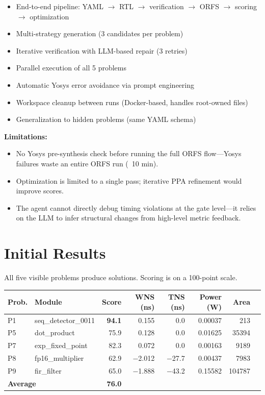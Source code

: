 \documentclass[10pt]{article}
\begin{document}
\begin{itemize}[topsep=2pt,itemsep=0pt]
  \item End-to-end pipeline: YAML $\to$ RTL $\to$ verification $\to$ ORFS $\to$ scoring $\to$ optimization
  \item Multi-strategy generation (3 candidates per problem)
  \item Iterative verification with LLM-based repair (3 retries)
  \item Parallel execution of all 5 problems
  \item Automatic Yosys error avoidance via prompt engineering
  \item Workspace cleanup between runs (Docker-based, handles root-owned files)
  \item Generalization to hidden problems (same YAML schema)
\end{itemize}

\textbf{Limitations:}

\begin{itemize}[topsep=2pt,itemsep=0pt]
  \item No Yosys pre-synthesis check before running the full ORFS flow---Yosys failures waste an entire ORFS run (~10 min).
  \item Optimization is limited to a single pass; iterative PPA refinement would improve scores.
  \item The agent cannot directly debug timing violations at the gate level---it relies on the LLM to infer structural changes 
    from high-level metric feedback.
\end{itemize}

\section{Initial Results}

All five visible problems produce solutions. Scoring is on a 100-point scale.

\begin{table}[ht]
\centering
\small
\begin{tabular}{llrrrrrr}
\toprule
\textbf{Prob.} & \textbf{Module} & \textbf{Score} & \textbf{WNS (ns)} & 
\textbf{TNS (ns)} & \textbf{Power (W)} & \textbf{Area} \\
\midrule
P1 & seq\_detector\_0011  & \textbf{94.1} & 0.155  &  0.0  & 0.00037 & 213 \\
P5 & dot\_product         & 75.9          & 0.128  &  0.0  & 0.01625 & 35394 \\
P7 & exp\_fixed\_point    & 82.3          & 0.072  &  0.0  & 0.00163 & 9189 \\
P8 & fp16\_multiplier     & 62.9          & $-$2.012 & $-$27.7 & 0.00437 & 7983 \\
P9 & fir\_filter          & 65.0          & $-$1.888 & $-$43.2 & 0.15582 & 104787 \\
\midrule
\multicolumn{2}{l}{\textbf{Average}} & \textbf{76.0} & & & & \\
\bottomrule
\end{tabular}
\end{table}
\end{document}
